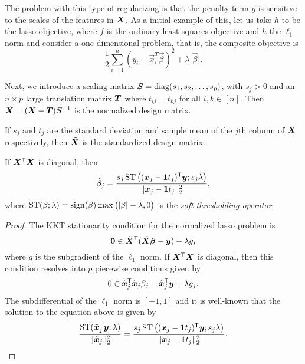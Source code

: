 
The problem with this type of regularizing is that the penalty term \(g\) is sensitive to the scales of the features in \(\mat X\). As a initial example of this, let us take \(h\) to be the lasso objective, where \(f\) is the ordinary least-squares objective and \(h\) the \(\ell_1\) norm and consider a one-dimensional problem, that is, the composite objective is
\[
  \frac{1}{2} \sum_{i=1}^n(y_i - \vec{x}^T_i \vec\beta)^2 + \lambda \lvert \vec\beta \rvert.
\]

Next, we introduce a scaling matrix \(\mat S = \diag(s_1, s_2, \dots, s_p)\), with \(s_j > 0\) and an \(n \times p\) large translation matrix \(\mat T\) where \(t_{ij} = t_{kj}\) for all \(i,k \in [n]\). Then \(\tilde{\mat X} = (\mat X - \mat T) \mat S^{-1}\) is the normalized design matrix.

\begin{example}
  If \(s_j\) and \(t_j\) are the standard deviation and sample mean of the \(j\)th column of \(\mat X\) respectively, then \(\tilde{\mat X}\) is the standardized design matrix.
\end{example}

\begin{proposition}
  If \(\mat X^\T \mat X\) is diagonal, then
  \[
    \hat{\beta}_j = \frac{s_j\softthreshold\big((\vec x_j - \vec{1}t_j)^\T\vec{y}; s_j\lambda\big)}{\lVert \vec x_j - \vec{1}t_j\rVert_2^2},
  \]
  where \(\operatorname{ST}(\beta; \lambda) = \operatorname{sign}(\beta)\max\big(\lvert \beta \rvert - \lambda, 0\big)\) is the \emph{soft thresholding operator}.
\end{proposition}
\begin{proof}
  The KKT stationarity condition for the normalized lasso problem is
  \[
    \vec{0} \in \tilde{\mat{X}}^\T(\tilde{\mat{X}}\vec{\beta} - \vec{y}) + \lambda g,
  \]
  where \(g\) is the subgradient of the \(\ell_1\) norm.
  If \(\mat{X}^\T\mat{X}\) is diagonal, then this condition resolves into \(p\) piecewise conditions given by
  \[
    0 \in \tilde{\vec{x}}_j^\T\tilde{\vec{x}}_j\beta_j - \tilde{\vec{x}}_j^\T\vec{y} + \lambda g_j.
  \]
  The subdifferential of the \(\ell_1\) norm is \([-1, 1]\) and it is well-known that the solution to the equation above is
  given by
  \[
    \frac{\softthreshold(\tilde{\vec{x}}_j^\T \vec{y}; \lambda)}{\lVert \tilde{\vec{x}}_j\rVert_2^2} =
    \frac{s_j\softthreshold\big((\vec{x}_j - \vec{1}t_j)^\T\vec{y}; s_j\lambda\big)}{\lVert \vec{x}_j - \vec{1}t_j\rVert_2^2}.
  \]
\end{proof}

